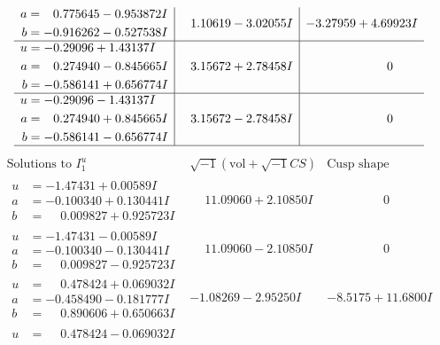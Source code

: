 \documentclass[1p]{elsarticle_modified}
\theoremstyle{definition}
\newcommand{\I}{\sqrt{-1}}
\begin{document}
$$\begin{array}{c|c|c}
\begin{aligned}
a &= \phantom{-}0.775645 - 0.953872 I \\
b &= -0.916262 - 0.527538 I\end{aligned}
 & \phantom{-}1.10619 - 3.02055 I & -3.27959 + 4.69923 I \\ \hline\begin{aligned}
u &= -0.29096 + 1.43137 I \\
a &= \phantom{-}0.274940 - 0.845665 I \\
b &= -0.586141 + 0.656774 I\end{aligned}
 & \phantom{-}3.15672 + 2.78458 I & \phantom{-0.000000 } 0 \\ \hline\begin{aligned}
u &= -0.29096 - 1.43137 I \\
a &= \phantom{-}0.274940 + 0.845665 I \\
b &= -0.586141 - 0.656774 I\end{aligned}
 & \phantom{-}3.15672 - 2.78458 I & \phantom{-0.000000 } 0\\
 \hline 
 \end{array}$$\newpage$$\begin{array}{c|c|c}  
\text{Solutions to }I^u_{1}& \I (\text{vol} + \sqrt{-1}CS) & \text{Cusp shape}\\
 \hline 
\begin{aligned}
u &= -1.47431 + 0.00589 I \\
a &= -0.100340 + 0.130441 I \\
b &= \phantom{-}0.009827 + 0.925723 I\end{aligned}
 & \phantom{-}11.09060 + 2.10850 I & \phantom{-0.000000 } 0 \\ \hline\begin{aligned}
u &= -1.47431 - 0.00589 I \\
a &= -0.100340 - 0.130441 I \\
b &= \phantom{-}0.009827 - 0.925723 I\end{aligned}
 & \phantom{-}11.09060 - 2.10850 I & \phantom{-0.000000 } 0 \\ \hline\begin{aligned}
u &= \phantom{-}0.478424 + 0.069032 I \\
a &= -0.458490 - 0.181777 I \\
b &= \phantom{-}0.890606 + 0.650663 I\end{aligned}
 & -1.08269 - 2.95250 I & -8.5175 + 11.6800 I \\ \hline\begin{aligned}
u &= \phantom{-}0.478424 - 0.069032 I \\

\end{aligned}
\end{array}$$
\end{document}
